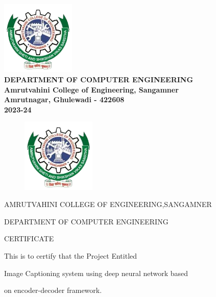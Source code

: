 \documentclass[oneside,a4paper,12pt]{report}
\begin{document}
\begin{center}
\includegraphics[width=100pt]{AVCOE_LOGO.png} \\
{\bfseries \fontsize{14}{12} \selectfont DEPARTMENT OF COMPUTER ENGINEERING \\
Amrutvahini College of Engineering, Sangamner\\
Amrutnagar, Ghulewadi - 422608 \\
2023-24
}
\end{center}

\newpage



\begin{figure}[ht]
\centering
\includegraphics[width=100pt]{AVCOE_LOGO.png}
\end{figure}


{\bfseries \fontsize{14}{12} \selectfont \centerline{AMRUTVAHINI COLLEGE OF ENGINEERING,SANGAMNER}
\centerline{DEPARTMENT OF COMPUTER ENGINEERING}
\vspace*{1\baselineskip}} 


{\bfseries \fontsize{16}{12} \selectfont \centerline{CERTIFICATE} 
\vspace*{1mm}}

\centerline{This is to certify that the Project Entitled}
\vspace{5mm}


{\bfseries \fontsize{14}{12} \selectfont \centerline{Image Captioning system using deep neural network based}
\vspace{0mm}}

{\bfseries \fontsize{14}{12} \selectfont \centerline{ on encoder-decoder framework.}

\vspace*{1mm}}
\end{document}
